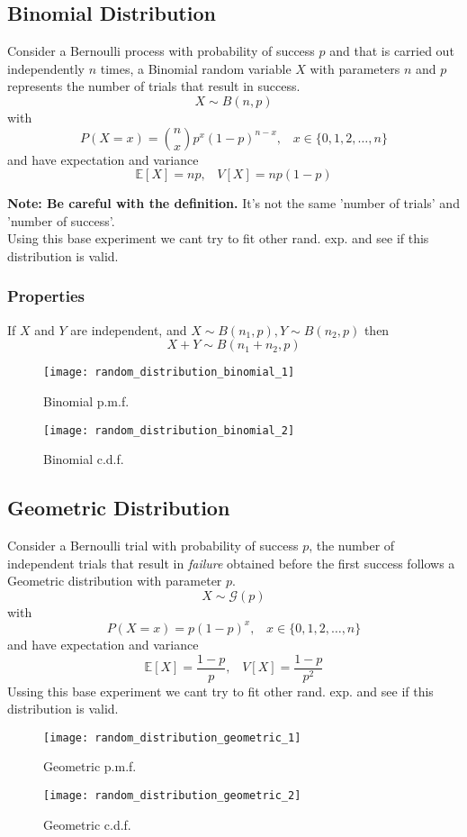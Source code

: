 \subsection{Binomial Distribution}
Consider a Bernoulli process with probability of success $p$ and that is carried
out independently $n$ times, a Binomial random variable $X$ with parameters $n$
and $p$ represents the number of trials that result in success.
\[ X \sim B(n, p) \] with
\[ P(X=x) = \binom{n}{x}p^x(1-p)^{n-x},\;\;\; x \in \{0,1,2,\dots,n\} \] and
have expectation and variance
\[ \mathbb{E}[X] = np,\;\;\; V[X] = np(1-p) \]

\textbf{Note: Be careful with the definition.} It's not the same 'number of
trials' and 'number of success'.\\
 Using this base
experiment we cant try to fit other rand. exp. and see if this distribution is
valid.


\subsubsection{Properties}
If $X$ and $Y$ are independent, and $X \sim B(n_1, p), Y \sim B(n_2, p)$ then 
\[ X+Y \sim B(n_1+n_2, p) \]

\begin{figure}[!ht]
    \begin{minipage}{0.45\linewidth}
      \texttt{[image: random\_distribution\_binomial\_1]}
      \caption{Binomial p.m.f.}
    \end{minipage}
    \hfill
    \begin{minipage}{0.45\linewidth}
      \texttt{[image: random\_distribution\_binomial\_2]}
      \caption{Binomial c.d.f.}
    \end{minipage}
\end{figure}

\subsection{Geometric Distribution}
Consider a Bernoulli trial with probability of success $p$, the number of
independent trials that result in \textit{failure} obtained before the first
success follows a Geometric distribution with parameter $p$.
\[ X \sim \mathcal{G}(p)\] with
\[ P(X=x) = p(1-p)^x,\;\;\; x \in \{0,1,2,\dots,n\} \] and have expectation and
variance
\[ \mathbb{E}[X] = \frac{1-p}{p},\;\;\; V[X] = \frac{1-p}{p^2} \]  Ussing this base experiment we cant try
to fit other rand. exp. and see if this distribution is valid.
\begin{figure}[!ht]
    \begin{minipage}{0.45\linewidth}
      \texttt{[image: random\_distribution\_geometric\_1]}
      \caption{Geometric p.m.f.}
    \end{minipage}
    \hfill
    \begin{minipage}{0.45\linewidth}
      \texttt{[image: random\_distribution\_geometric\_2]}
      \caption{Geometric c.d.f.}
    \end{minipage}
\end{figure}

